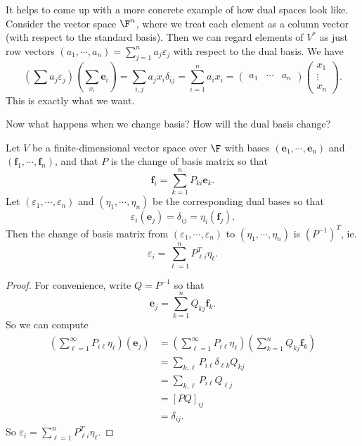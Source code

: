 \documentclass[a4paper]{article}
\begin{document}
It helps to come up with a more concrete example of how dual spaces look like. Consider the vector space $\F^n$, where we treat each element as a column vector (with respect to the standard basis). Then we can regard elements of $V^*$ as just row vectors $(a_1, \cdots, a_n) = \sum_{j = 1}^n a_j\varepsilon_j$ with respect to the dual basis. We have
\[
  \left(\sum a_j \varepsilon_j\right)\left(\sum_{x_i}\mathbf{e}_i\right) = \sum_{i, j} a_j x_i \delta_{ij} = \sum_{i = 1}^n a_i x_i =
  \begin{pmatrix}
    a_1 & \cdots & a_n
  \end{pmatrix}
  \begin{pmatrix}
    x_1\\\vdots\\x_n
  \end{pmatrix}.
\]
This is exactly what we want.

Now what happens when we change basis? How will the dual basis change?
\begin{prop}
  Let $V$ be a finite-dimensional vector space over $\F$ with bases $(\mathbf{e}_1, \cdots, \mathbf{e}_n)$ and $(\mathbf{f}_1, \cdots, \mathbf{f}_n)$, and that $P$ is the change of basis matrix so that
  \[
    \mathbf{f}_i = \sum_{k = 1}^n P_{ki}\mathbf{e}_k.
  \]
  Let $(\varepsilon_1, \cdots, \varepsilon_n)$ and $(\eta_1, \cdots, \eta_n)$ be the corresponding dual bases so that
  \[
    \varepsilon_i (\mathbf{e}_j) = \delta_{ij} = \eta_i (\mathbf{f}_j).
  \]
  Then the change of basis matrix from $(\varepsilon_1, \cdots, \varepsilon_n)$ to $(\eta_1, \cdots, \eta_n)$ is $(P^{-1})^T$, ie.
  \[
    \varepsilon_i = \sum_{\ell = 1}^n P_{\ell i}^T \eta_\ell.
  \]
\end{prop}

\begin{proof}
  For convenience, write $Q = P^{-1}$ so that
  \[
    \mathbf{e}_j = \sum_{k = 1}^n Q_{kj}\mathbf{f}_k.
  \]
  So we can compute
  \begin{align*}
    \left(\sum_{\ell = 1}^\infty P_{i\ell}\eta_\ell\right)(\mathbf{e}_j) &= \left(\sum_{\ell = 1}^\infty P_{i\ell}\eta_\ell\right)\left(\sum_{k = 1}^n Q_{kj}\mathbf{f}_k\right)\\
    &= \sum_{k, \ell} P_{i\ell}\delta_{\ell k} Q_{kj}\\
    &= \sum_{k, \ell} P_{i\ell} Q_{\ell j}\\
    &= [PQ]_{ij}\\
    &= \delta_{ij}.
  \end{align*}
  So $\varepsilon_i = \sum_{\ell = 1}^n P_{\ell i}^T \eta_\ell$.
\end{proof}
\end{document}
